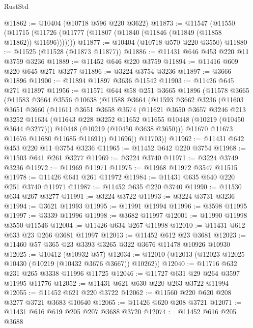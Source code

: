 \begin{lexlean}{RustStd}
\begin{coremodule}
@11862 := @10404 (@10718 @596 @220 @3622)
@11873 := @11547
    (@11550 (@11715 (@11726 (@11777 (@11807 (@11840 (@11846 (@11849 (@11858 @11862)) @11696)))))))
@11877 := @10404 (@10718 @570 @220 @3550)
@11880 := @11525 (@11528 (@11873 @11877))
@11886 := @11431 @646 @453 @220 @11 @3759 @3236
@11889 := @11452 @646 @220 @3759
@11894 := @11416 @609 @220 @645 @271 @3277
@11896 := @3224 @3754 @3236
@11897 := @3666 @11896
@11900 := @11894 @11897 @3636 @11542
@11903 := @11426 @645 @271 @11897
@11956 := @11571
    @644
    @58
    @251
    @3665
    @11896
    (@11578
      @3665
      (@11583
        @3664
        @3556
        @10638
        (@11588
          @3664
          (@11593
            @3662
            @3236
            (@11603
              @3651
              @3660
              (@11611
                @3651
                @3658
                @3574
                (@11621
                  @3650
                  @3657
                  @3246
                  @213
                  @3252
                  @11634
                  (@11643 @228 @3252 @11652 @11655 @10448 (@10219 (@10450 @3644 @3277)))
                  @10448
                  (@10219 (@10450 @3638 @3650)))
                @11670
                @11673
                @11676
                @11680
                @11685
                @11691))
            @11696))
        @11703))
@11962 := @11431 @642 @453 @220 @11 @3754 @3236
@11965 := @11452 @642 @220 @3754
@11968 := @11503 @641 @261 @3277
@11969 := @3224 @3740
@11971 := @3224 @3749 @3236
@11972 := @11969 @11971
@11975 := @11968 @11972 @3547 @11515
@11978 := @11426 @641 @261 @11972
@11984 := @11431 @635 @640 @220 @251 @3740 @11971
@11987 := @11452 @635 @220 @3740
@11990 := @11530 @634 @267 @3277
@11991 := @3224 @3722
@11993 := @3224 @3731 @3236
@11994 := @3621 @11993
@11995 := @11991 @11994
@11996 := @3598 @11995
@11997 := @3339 @11996
@11998 := @3682 @11997
@12001 := @11990 @11998 @3550 @11546
@12004 := @11426 @634 @267 @11998
@12010 := @11431 @612 @633 @23 @266 @3681 @11997
@12013 := @11452 @612 @23 @3681
@12023 := @11460 @57 @365 @23 @3393 @3265 @322 @3676 @11478 @10926 @10930
@12025 := @10412 (@10932 @57)
@12034 := @12010 (@12013 (@12023 @12025 @10430 (@10219 (@10432 @3676 @3667)) @10262))
@12040 := @11716 @632 @231 @265 @3338 @11996 @11725
@12046 := @11727 @631 @29 @264 @3597 @11995 @11776
@12052 := @11431 @621 @630 @220 @263 @3722 @11994
@12055 := @11452 @621 @220 @3722
@12062 := @11560 @220 @620 @208 @3277 @3721 @3683 @10640
@12065 := @11426 @620 @208 @3721
@12071 := @11431 @616 @619 @205 @207 @3688 @3720
@12074 := @11452 @616 @205 @3688

\end{coremodule}
\end{lexlean}
